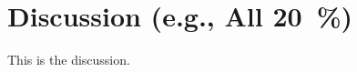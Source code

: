 
\section{Discussion (e.g., All \qty{20}{\percent})}%
\label{sec:Discussion}%

This is the discussion.
